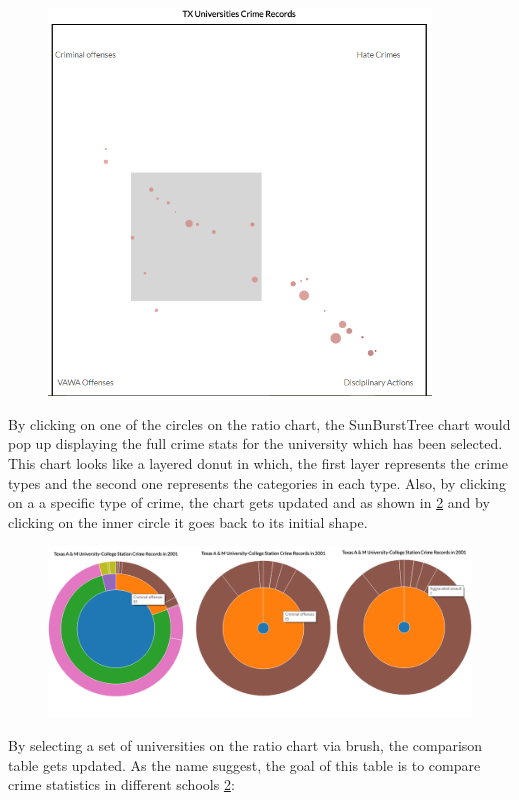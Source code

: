\documentclass[12pt]{article}
\begin{document}
\begin{figure}[H]
   \centering{}
	       \includegraphics[width=4in]{ratio.PNG}           
\caption{}
\label{fig:ratio}
\end{figure}

By clicking on one of the circles on the ratio chart, the SunBurstTree chart would pop up displaying the full crime stats for the university which has been selected. This chart looks like a layered donut in which, the first layer represents the crime types and the second one represents the categories in each type. Also, by clicking on a a specific type of crime, the chart gets updated and as shown in \cref{fig:donut} and by clicking on the inner circle it goes back to its initial shape.

\begin{figure}[H]
   \centering{}
	       \includegraphics[width=7in]{donut.PNG}           
\caption{}
\label{fig:donut}
\end{figure}

By selecting a set of universities on the ratio chart via brush, the comparison table gets updated. As the name suggest, the goal of this table is to compare crime statistics in different schools \cref{fig:donut}:
\end{document}
